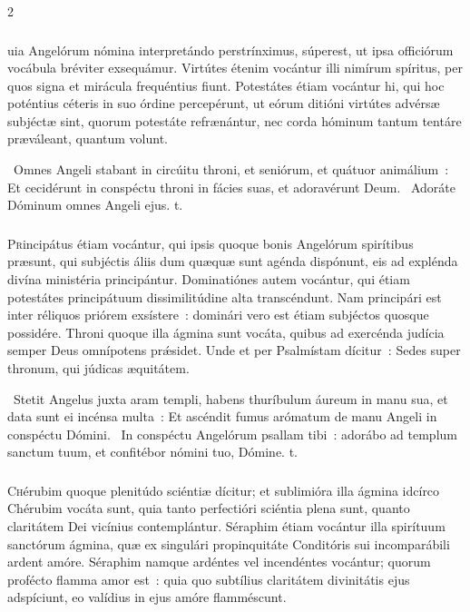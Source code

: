 \documentclass[9pt,twoside]{extarticle}
\begin{document}
\begin{multicols}{2}
{\subsubsection*{\center {}}
uia Angelórum nómina interpretándo perstrínximus, súperest, ut ipsa officiórum vocábula bréviter exsequámur. Virtútes étenim vocántur illi nimírum spíritus, per quos signa et mirácula frequéntius fiunt. Potestátes étiam vocántur hi, qui hoc poténtius céteris in suo órdine percepérunt, ut eórum ditióni virtútes advérsæ subjéctæ sint, quorum potestáte refrænántur, nec corda hóminum tantum tentáre præváleant, quantum volunt.

\begin{tightlist}{}
\item {}~Omnes Angeli stabant in circúitu throni, et seniórum, et quátuor animálium~: \textred{*} Et cecidérunt in conspéctu throni in fácies suas, et adoravérunt Deum. ~Adoráte Dóminum omnes Angeli ejus. t.
\end{tightlist}

\subsubsection*{\center {}}
\lettrine{P}rincipátus étiam vocántur, qui ipsis quoque bonis Angelórum spirítibus præsunt, qui subjéctis áliis dum quæquæ sunt agénda dispónunt, eis ad explénda divína ministéria principántur. Dominatiónes autem vocántur, qui étiam potestátes principátuum dissimilitúdine alta transcéndunt. Nam principári est inter réliquos priórem exsístere~: dominári vero est étiam subjéctos quosque possidére. Throni quoque illa ágmina sunt vocáta, quibus ad exercénda judícia semper Deus omnípotens prǽsidet. Unde et per Psalmístam dícitur~: Sedes super thronum, qui júdicas æquitátem.

\begin{tightlist}{}
\item {}~Stetit Angelus juxta aram templi, habens thuríbulum áureum in manu sua, et data sunt ei incénsa multa~: \textred{*} Et ascéndit fumus arómatum de manu Angeli in conspéctu Dómini. ~In conspéctu Angelórum psallam tibi~: adorábo ad templum sanctum tuum, et confitébor nómini tuo, Dómine. t.
\end{tightlist}

\subsubsection*{\center {}}
\lettrine{C}hérubim quoque plenitúdo sciéntiæ dícitur; et sublimióra illa ágmina idcírco Chérubim vocáta sunt, quia tanto perfectióri sciéntia plena sunt, quanto claritátem Dei vicínius contemplántur. Séraphim étiam vocántur illa spirítuum sanctórum ágmina, quæ ex singulári propinquitáte Conditóris sui incomparábili ardent amóre. Séraphim namque ardéntes vel incendéntes vocántur; quorum profécto flamma amor est~: quia quo subtílius claritátem divinitátis ejus adspíciunt, eo valídius in ejus amóre flamméscunt.

}
\end{multicols}
\end{document}

